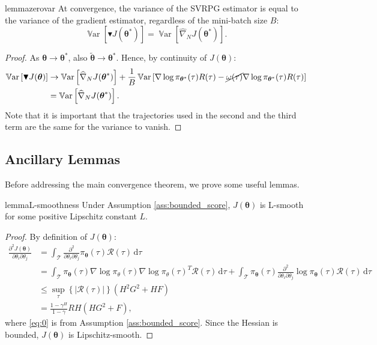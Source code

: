 \documentclass{article}
\theoremstyle{remark}
\theoremstyle{definition}
\DeclareMathOperator*{\Var}{\mathbb{V}ar}
\newcommand{\Dij}[2]{\frac{\partial^{2}{#1}}{\partial{#2}_i\partial{#2}_j}}
\newcommand{\de}{\,\mathrm{d}}
\newcommand{\vtheta}{\boldsymbol{\theta}}
\newcommand{\Tspace}{\mathcal{T}}
\newcommand{\Reward}{\mathcal{R}}
\newcommand{\pol}{\pi_{\vtheta}}
\newcommand{\score}[2]{\nabla\log\pi_{#1}(#2)}
\newcommand{\gradApp}[2]{\widehat{\nabla}_{#2}J(#1)}
\newcommand{\gradBlack}[1]{\blacktriangledown J(#1)}
\newcommand{\GRADLOG}{G}
\newcommand{\HESSLOG}{F}
\begin{document}
\begin{restatable}{lemma}{zerovar}\label{lemma:zerovar}
At convergence, the variance of the SVRPG estimator is equal to the variance of the gradient estimator, regardless of the mini-batch size $B$:
\[
	\Var\left[\gradBlack{\vtheta^*}\right] = 
	\Var\left[\gradApp{\vtheta^*}{N}\right].
\]
\end{restatable}
\begin{proof}
As $\vtheta\to\vtheta^*$, also $\tilde{\vtheta}\to\vtheta^*$. Hence, by continuity of $J(\vtheta)$:
\begin{align*}
\Var\left[\gradBlack{\vtheta}\right] &\to \Var\left[\gradApp{\vtheta^*}{N}\right] + \frac{1}{B}\Var\left[\score{\vtheta^*}{\tau}R(\tau) - \cancel{\omega(\tau)}\score{\vtheta^*}{\tau}R(\tau)\right] \\
&= \Var\left[\gradApp{\vtheta^*}{N}\right].
\end{align*}
Note that it is important that the trajectories used in the second and the third term are the same for the variance to vanish.
\end{proof}

\subsection*{Ancillary Lemmas}
Before addressing the main convergence theorem, we prove some useful lemmas.

 
\begin{restatable}[]{lemma}{L-smoothness}\label{lemma:lsmooth}
	Under Assumption \ref{ass:bounded_score}, $J(\vtheta)$ is L-smooth for some positive Lipschitz constant $L$.
\end{restatable}
\begin{proof}
By definition of $J(\vtheta)$:
\begin{align}
\Dij{J(\vtheta)}{\theta} 
&= \int_{\Tspace}\Dij{}{\theta}\pol(\tau)\Reward(\tau)\de \tau
\nonumber\\ 
&= \int_{\Tspace}\pol(\tau)\score{\theta}{\tau}\score{\theta}{\tau}^T\Reward(\tau)\de \tau + \int_{\Tspace}\pol(\tau)\Dij{}{\theta}\log\pol(\tau)\Reward(\tau)\de \tau \nonumber\\
&\leq \sup_{\tau} \left\{\left|\Reward(\tau)\right|\right\} \left(H^2\GRADLOG^2+H\HESSLOG\right) \label{eq:0}\\
&= \frac{1-\gamma^H}{1-\gamma}RH\left(H\GRADLOG^2+\HESSLOG\right),\nonumber
\end{align}
where \ref{eq:0} is from Assumption \ref{ass:bounded_score}.
Since the Hessian is bounded, $J(\vtheta)$ is Lipschitz-smooth.
\end{proof}
\end{document}
